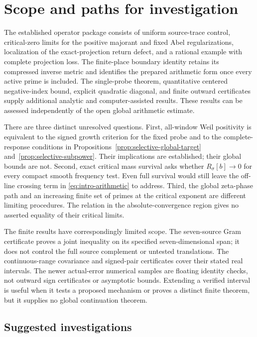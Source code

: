 \documentclass[11pt]{article}
\numberwithin{equation}{section}
\theoremstyle{definition}
\theoremstyle{remark}
\begin{document}
\section{Scope and paths for investigation}\label{sec:scope}

The established operator package consists of uniform source-trace control,
critical-zero limits for the positive majorant and fixed Abel
regularizations, localization of the exact-projection return defect, and
a rational example with complete projection loss. The finite-place
boundary identity retains its compressed inverse metric and identifies
the prepared arithmetic form once every active prime is included.
The single-probe theorem, quantitative centered negative-index bound,
explicit quadratic diagonal, and finite outward certificates supply
additional analytic and computer-assisted results. These results can be
assessed independently of the open global arithmetic estimate.

There are three distinct unresolved questions. First, all-window Weil
positivity is equivalent to the signed growth criterion for the fixed
probe and to the complete-response conditions in
Propositions~\ref{prop:selective-global-target}
and~\ref{prop:selective-subpower}. Their implications are established;
their global bounds are not. Second, exact critical mass survival asks
whether \(R_\sigma[b]\to0\) for every compact smooth frequency test.
Even full survival would still leave the off-line crossing term in
\eqref{eq:intro-arithmetic} to address. Third, the global zeta-phase path
and an increasing finite set of primes at the critical exponent are
different limiting procedures. The relation in the absolute-convergence
region gives no asserted equality of their critical limits.

The finite results have correspondingly limited scope. The seven-source
Gram certificate proves a joint inequality on its specified
seven-dimensional span; it does not control the full source complement
or untested translations. The continuous-range covariance and
signed-pair certificates cover their stated real intervals. The newer
actual-error numerical samples are floating identity checks, not
outward sign certificates or asymptotic bounds. Extending a verified
interval is useful when it tests a proposed mechanism or proves a
distinct finite theorem, but it supplies no global continuation theorem.

\subsection{Suggested investigations}\label{sec:investigation-paths}
\end{document}
